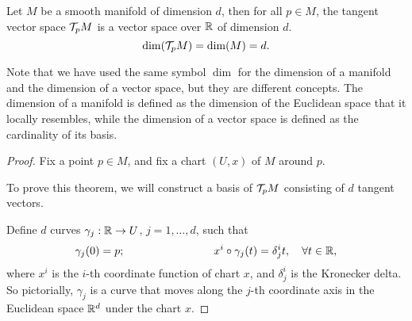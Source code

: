 \begin{theorem}
    Let \(M\) be a smooth manifold of dimension \(d\), then for all \(p \in M\), the tangent vector space \(\mathcal T_p M\) is a vector space over \(\mathbb R\) of dimension \(d\).
    \begin{equation}
        \dim(\mathcal T_p M) = \dim(M) = d.
    \end{equation}
\end{theorem}
Note that we have used the same symbol \(\dim\) for the dimension of a manifold and the dimension of a vector space, but they are different concepts. The dimension of a manifold is defined as the dimension of the Euclidean space that it locally resembles, while the dimension of a vector space is defined as the cardinality of its basis.
\begin{proof}
    Fix a point \(p \in M\), and fix a chart \((U, x)\) of \(M\) around \(p\).

    To prove this theorem, we will construct a basis of \(\mathcal T_p M\) consisting of \(d\) tangent vectors.

    Define \(d\) curves \(\gamma_j: \mathbb R \to U\), \(j = 1, \ldots, d\), such that
    \begin{equation}
        \gamma_j(0) = p; \qquad \qquad \qquad \qquad x^i \circ \gamma_j(t) = \delta_j^i t, \quad \forall t \in \mathbb R,
    \end{equation}
    where \(x^i\) is the \(i\)-th coordinate function of chart \(x\), and \(\delta_j^i\) is the Kronecker delta. So pictorially, \(\gamma_j\) is a curve that moves along the \(j\)-th coordinate axis in the Euclidean space \(\mathbb R^d\) under the chart \(x\).


\end{proof}
